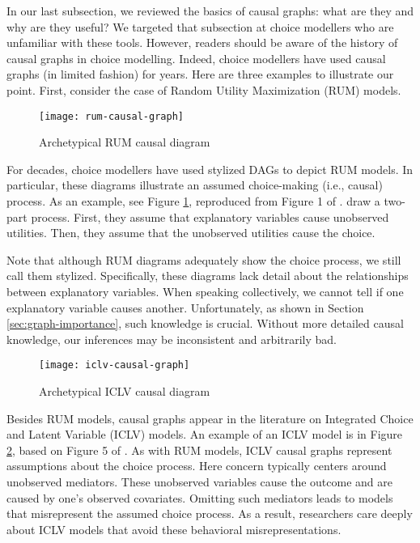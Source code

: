 In our last subsection, we reviewed the basics of causal graphs: what are they and why are they useful?
We targeted that subsection at choice modellers who are unfamiliar with these tools.
However, readers should be aware of the history of causal graphs in choice modelling.
Indeed, choice modellers have used causal graphs (in limited fashion) for years.
Here are three examples to illustrate our point.
First, consider the case of Random Utility Maximization (RUM) models.

\begin{figure}
   \centering
   \texttt{[image: rum-causal-graph]}
   \caption{Archetypical RUM causal diagram}
   \label{fig:example-graph-rum}
\end{figure}

For decades, choice modellers have used stylized DAGs to depict RUM models.
In particular, these diagrams illustrate an assumed choice-making (i.e., causal) process.
As an example, see Figure \ref{fig:example-graph-rum}, reproduced from Figure 1 of \citet{ben_2002_integration}.
\citeauthor{ben_2002_integration} draw a two-part process.
First, they assume that explanatory variables cause unobserved utilities.
Then, they assume that the unobserved utilities cause the choice.

Note that although RUM diagrams adequately show the choice process, we still call them stylized.
Specifically, these diagrams lack detail about the relationships between explanatory variables.
When speaking collectively, we cannot tell if one explanatory variable causes another.
Unfortunately, as shown in Section \ref{sec:graph-importance}, such knowledge is crucial.
Without more detailed causal knowledge, our inferences may be inconsistent and arbitrarily bad.

\begin{figure}
   \centering
   \texttt{[image: iclv-causal-graph]}
   \caption{Archetypical ICLV causal diagram}
   \label{fig:example-graph-iclv}
\end{figure}


Besides RUM models, causal graphs appear in the literature on Integrated Choice and Latent Variable (ICLV) models.
An example of an ICLV model is in Figure \ref{fig:example-graph-iclv}, based on Figure 5 of \citet{ben_2002_integration}.
As with RUM models, ICLV causal graphs represent assumptions about the choice process.
Here concern typically centers around unobserved mediators.
These unobserved variables cause the outcome and are caused by one's observed covariates.
Omitting such mediators leads to models that misrepresent the assumed choice process.
As a result, researchers care deeply about ICLV models that avoid these behavioral misrepresentations.

